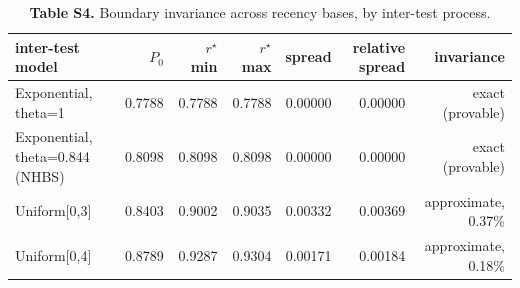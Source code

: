 \begin{table}[htbp]
  \centering
  \small
  \caption*{\textbf{Table S4.} Boundary invariance across recency bases, by inter-test process.}
  \label{tab:table_s4}
  \begin{tabular}{lrrrrrr}
    \toprule
    inter-test model & $P_0$ & $r^\star$ min & $r^\star$ max & spread & relative spread & invariance \\
    \midrule
    Exponential, theta=1 & 0.7788 & 0.7788 & 0.7788 & 0.00000 & 0.00000 & exact (provable) \\
    Exponential, theta=0.844 (NHBS) & 0.8098 & 0.8098 & 0.8098 & 0.00000 & 0.00000 & exact (provable) \\
    Uniform[0,3] & 0.8403 & 0.9002 & 0.9035 & 0.00332 & 0.00369 & approximate, 0.37\% \\
    Uniform[0,4] & 0.8789 & 0.9287 & 0.9304 & 0.00171 & 0.00184 & approximate, 0.18\% \\
    \bottomrule
  \end{tabular}
\end{table}
